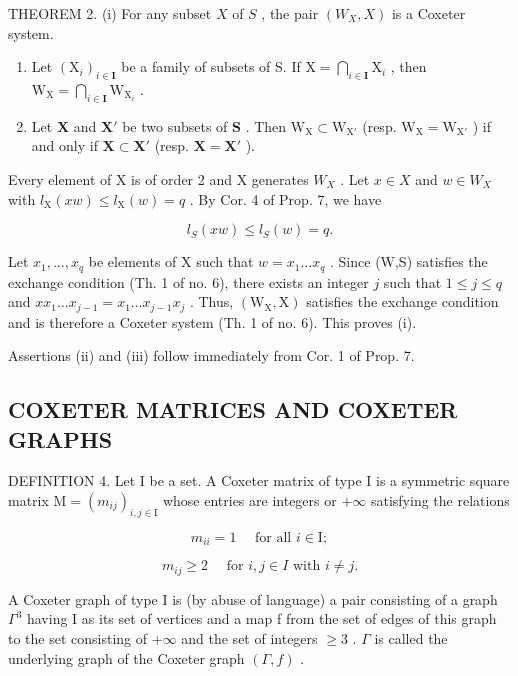 THEOREM 2. (i) For any subset \(X\) of \(S\) , the pair \((W_X, X)\) is a Coxeter system.

\begin{enumerate}
\def\labelenumi{(\roman{enumi})}
\setcounter{enumi}{1}
\item
  Let \((\mathrm{X}_i)_{i\in \mathbf{I}}\) be a family of subsets of S. If \(\mathrm{X} = \bigcap_{i\in \mathbf{I}}\mathrm{X}_i\) , then \(\mathrm{W_X} = \bigcap_{i\in \mathbf{I}}\mathrm{W}_{\mathrm{X}_i}\) .
\item
  Let \(\mathbf{X}\) and \(\mathbf{X}'\) be two subsets of \(\mathbf{S}\) . Then \(\mathrm{W_X} \subset \mathrm{W_{X'}}\) (resp. \(\mathrm{W_X} = \mathrm{W_{X'}}\) ) if and only if \(\mathbf{X} \subset \mathbf{X'}\) (resp. \(\mathbf{X} = \mathbf{X'}\) ).
\end{enumerate}

Every element of X is of order 2 and X generates \(W_{X}\) . Let \(x \in X\) and \(w \in W_{X}\) with \(l_{\mathrm{X}}(xw) \leqslant l_{\mathrm{X}}(w) = q\) . By Cor. 4 of Prop. 7, we have

\[
l _ {S} (x w) \leqslant l _ {S} (w) = q.
\]

Let \(x_{1},\ldots ,x_{q}\) be elements of X such that \(w = x_{1}\dots x_{q}\) . Since (W,S) satisfies the exchange condition (Th. 1 of no. 6), there exists an integer \(j\) such that \(1\leqslant j\leqslant q\) and \(xx_{1}\ldots x_{j - 1} = x_{1}\ldots x_{j - 1}x_{j}\) . Thus, \((\mathrm{W_X},\mathrm{X})\) satisfies the exchange condition and is therefore a Coxeter system (Th. 1 of no. 6). This proves (i).

Assertions (ii) and (iii) follow immediately from Cor. 1 of Prop. 7.

\subsection{COXETER MATRICES AND COXETER GRAPHS}

DEFINITION 4. Let I be a set. A Coxeter matrix of type I is a symmetric square matrix \(\mathrm{M} = (m_{ij})_{i,j\in \mathrm{I}}\) whose entries are integers or \(+\infty\) satisfying the relations

\[
m _ {i i} = 1 \quad \text {   for   all   } i \in \mathrm{I};\tag{25}
\]

\[
m _ {i j} \geqslant 2 \quad \text {   for   } i, j \in I \text {   with   } i \neq j.\tag{26}
\]

A Coxeter graph of type I is (by abuse of language) a pair consisting of a graph \(\Gamma^{3}\) having I as its set of vertices and a map f from the set of edges of this graph to the set consisting of \(+\infty\) and the set of integers \(\geqslant 3\) . \(\Gamma\) is called the underlying graph of the Coxeter graph \((\Gamma, f)\) .

